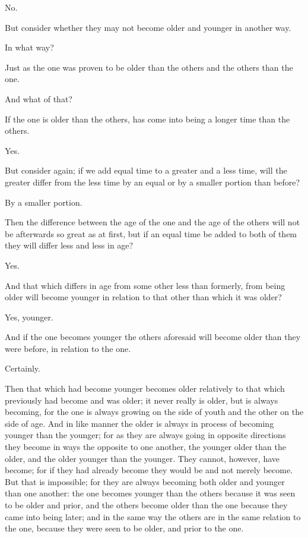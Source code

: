 No.

But consider whether they may not become older and younger in another
way.

In what way?

Just as the one was proven to be older than the others and the others
than the one.

And what of that?

If the one is older than the others, has come into being a longer time
than the others.

Yes.

But consider again; if we add equal time to a greater and a less time,
will the greater differ from the less time by an equal or by a smaller
portion than before?

By a smaller portion.

Then the difference between the age of the one and the age of the others
will not be afterwards so great as at first, but if an equal time be
added to both of them they will differ less and less in age?

Yes.

And that which differs in age from some other less than formerly, from
being older will become younger in relation to that other than which it
was older?

Yes, younger.

And if the one becomes younger the others aforesaid will become older
than they were before, in relation to the one.

Certainly.

Then that which had become younger becomes older relatively to that
which previously had become and was older; it never really is older, but
is always becoming, for the one is always growing on the side of youth
and the other on the side of age. And in like manner the older is always
in process of becoming younger than the younger; for as they are always
going in opposite directions they become in ways the opposite to one
another, the younger older than the older, and the older younger than
the younger. They cannot, however, have become; for if they had already
become they would be and not merely become. But that is impossible; for
they are always becoming both older and younger than one another: the
one becomes younger than the others because it was seen to be older and
prior, and the others become older than the one because they came into
being later; and in the same way the others are in the same relation to
the one, because they were seen to be older, and prior to the one.

